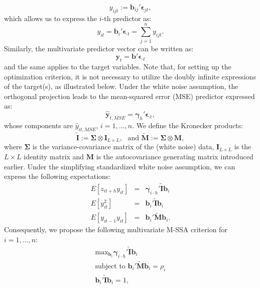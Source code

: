 \documentclass[11pt,a4paper]{article}
\begin{document}
\[
y_{ijt} := \mathbf{b}_{ij}'\boldsymbol{\epsilon}_{jt},
\]
which allows us to express the $i$-th predictor as:
\[
y_{it} = \mathbf{b}_i'\boldsymbol{\epsilon}_{\cdot t} = \sum_{j=1}^n y_{ijt}.
\] 
Similarly, the multivariate predictor vector can be written as:
\[
\mathbf{y}_t = \mathbf{b}'\boldsymbol{\epsilon}_{\cdot t}
\]
and the same applies to the target variables. Note that, for setting up the optimization criterion, it is not necessary to utilize the doubly infinite expressions of the target(s), as illustrated below. Under the white noise assumption, the orthogonal projection leads to the mean-squared error (MSE) predictor expressed as:
\[
\hat{\mathbf{y}}_{t,MSE} = \boldsymbol{\gamma}_{h}'\boldsymbol{\epsilon}_{\cdot t},
\]
whose components are $\hat{y}_{it,MSE}$, $i=1,...,n$. We define the Kronecker products: 
\[
\tilde{\mathbf{I}}:=\boldsymbol{\Sigma}\otimes\mathbf{I}_{L\times L},\textrm{ ~and~} \tilde{\mathbf{M}}:=\boldsymbol{\Sigma}\otimes\mathbf{M},
\]
where $\boldsymbol{\Sigma}$ is the variance-covariance matrix of the (white noise) data,  $\mathbf{I}_{L\times L}$ is the  $L\times L$ identity matrix  and  $\mathbf{M}$ is the autocovariance generating matrix introduced earlier. Under the simplifying standardized white noise assumption, we can express the following expectations: 
\begin{eqnarray}
E[z_{it+h}y_{it}]&=&\boldsymbol{\gamma}_{i\cdot h}'\tilde{\mathbf{I}}\mathbf{b}_{i}\nonumber\\%
E[y_{it}^2]&=&\mathbf{b}_{i}'\tilde{\mathbf{I}}\mathbf{b}_{i}\nonumber\\%
E[y_{it-1}y_{it}]&=&\mathbf{b}_{i}'\tilde{\mathbf{M}}\mathbf{b}_{i}.\nonumber
\end{eqnarray}
Consequently, we propose the following multivariate M-SSA criterion for $i=1,...,n$: 
\begin{eqnarray}\label{mcrit1}
\textrm{max}_{\mathbf{b}_i}\boldsymbol{\gamma}_{i\cdot h}'\tilde{\mathbf{I}}\mathbf{b}_{i}\\
\textrm{subject~to~}\mathbf{b}_{i}'\tilde{\mathbf{M}}\mathbf{b}_{i}=\rho_i\nonumber\\
\mathbf{b}_{i}'\tilde{\mathbf{I}}\mathbf{b}_{i}=1,\nonumber
\end{eqnarray}
\end{document}
